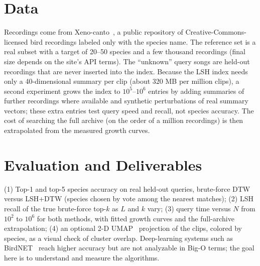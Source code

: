 \documentclass[10pt]{article}
\begin{document}
\section{Data}
Recordings come from Xeno-canto~\cite{xc}, a public repository of Creative-Commons-licensed bird recordings labeled only with the species name. The reference set is a real subset with a target of 20--50 species and a few thousand recordings (final size depends on the site's API terms). The ``unknown'' query songs are held-out recordings that are never inserted into the index. Because the LSH index needs only a 40-dimensional summary per clip (about 320 MB per million clips), a second experiment grows the index to $10^5$--$10^6$ entries by adding summaries of further recordings where available and synthetic perturbations of real summary vectors; these extra entries test query speed and recall, not species accuracy. The cost of searching the full archive (on the order of a million recordings) is then extrapolated from the measured growth curves.

\section{Evaluation and Deliverables}
(1) Top-1 and top-5 species accuracy on real held-out queries, brute-force DTW versus LSH+DTW (species chosen by vote among the nearest matches); (2) LSH recall of the true brute-force top-$k$ as $L$ and $k$ vary; (3) query time versus $N$ from $10^2$ to $10^6$ for both methods, with fitted growth curves and the full-archive extrapolation; (4) an optional 2-D UMAP~\cite{umap} projection of the clips, colored by species, as a visual check of cluster overlap. Deep-learning systems such as BirdNET~\cite{birdnet} reach higher accuracy but are not analyzable in Big-O terms; the goal here is to understand and measure the algorithms.
\end{document}
